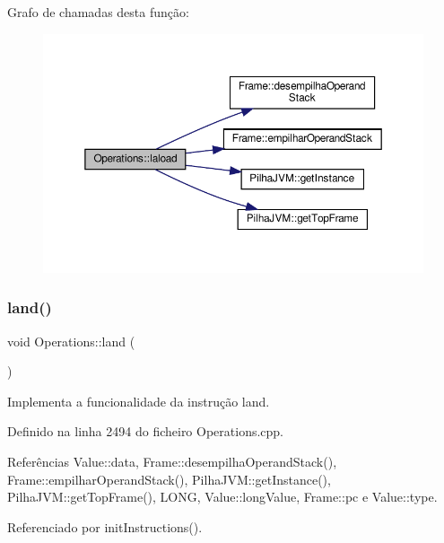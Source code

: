 Grafo de chamadas desta função\+:
\nopagebreak
\begin{figure}[H]
\begin{center}
\leavevmode
\includegraphics[width=350pt]{classOperations_a064f10825e8f0153ef19d466845d3734_cgraph}
\end{center}
\end{figure}
\mbox{\label{classOperations_a6104d728be025abb71570139b988ed4e}} 
\subsubsection{\texorpdfstring{land()}{land()}}
{\footnotesize\ttfamily void Operations\+::land (\begin{DoxyParamCaption}{ }\end{DoxyParamCaption})\hspace{0.3cm}{\ttfamily [private]}}



Implementa a funcionalidade da instrução land. 



Definido na linha 2494 do ficheiro Operations.\+cpp.



Referências Value\+::data, Frame\+::desempilha\+Operand\+Stack(), Frame\+::empilhar\+Operand\+Stack(), Pilha\+J\+V\+M\+::get\+Instance(), Pilha\+J\+V\+M\+::get\+Top\+Frame(), L\+O\+NG, Value\+::long\+Value, Frame\+::pc e Value\+::type.



Referenciado por init\+Instructions().

